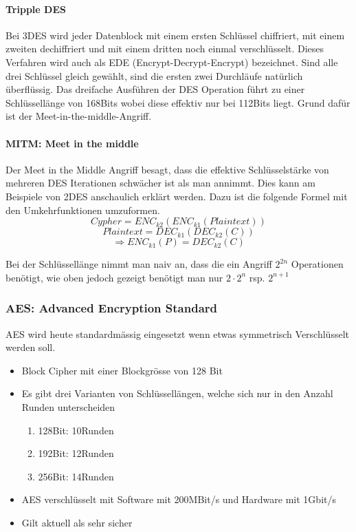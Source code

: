 \paragraph{Tripple DES} Bei 3DES wird jeder Datenblock mit einem ersten Schlüssel chiffriert, mit einem zweiten dechiffriert und mit einem dritten noch einmal verschlüsselt. Dieses Verfahren wird auch als EDE (Encrypt-Decrypt-Encrypt) bezeichnet. Sind alle drei Schlüssel gleich gewählt, sind die ersten zwei Durchläufe natürlich überflüssig. Das dreifache Ausführen der DES Operation führt zu einer Schlüssellänge von 168Bits wobei diese effektiv nur bei 112Bits liegt. Grund dafür ist der Meet-in-the-middle-Angriff.

\paragraph{MITM: Meet in the middle}
Der Meet in the Middle Angriff besagt, dass die effektive Schlüsselstärke von mehreren DES Iterationen schwächer ist als man annimmt. Dies kann am Beispiele von 2DES anschaulich erklärt werden. Dazu ist die folgende Formel mit den Umkehrfunktionen umzuformen.
\[
 Cypher = ENC_{k2}(ENC_{k1}(Plaintext))
\]
\[
 Plaintext = DEC_{k1}(DEC_{k2}(C)) 
\]
\[
\Rightarrow ENC_{k1}(P) = DEC_{k2}(C)
\]

Bei der Schlüssellänge nimmt man naiv an, dass die ein Angriff $2^{2n}$ Operationen benötigt, wie oben jedoch gezeigt benötigt man nur $2 \cdot 2^n$ rsp. $2^{n + 1}$


\subsubsection{AES: Advanced Encryption Standard}
AES wird heute standardmässig eingesetzt wenn etwas symmetrisch Verschlüsselt werden soll.
\begin{itemize}
	\item Block Cipher mit einer Blockgrösse von 128 Bit
	\item Es gibt drei Varianten von Schlüssellängen, welche sich nur in den Anzahl Runden unterscheiden
	\begin{enumerate}
		\item 128Bit: 10Runden
		\item 192Bit: 12Runden
		\item 256Bit: 14Runden
	\end{enumerate}
	\item AES verschlüsselt mit Software mit 200MBit/s und Hardware mit 1Gbit/s
	\item Gilt aktuell als sehr sicher
\end{itemize}

